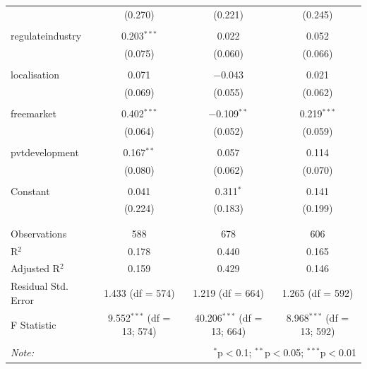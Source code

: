 \documentclass[
]{article}
\begin{document}
\begin{table}[!htbp]
\begin{tabular}{@{\extracolsep{5pt}}lccc}
  & (0.270) & (0.221) & (0.245) \\ 
  & & & \\ 
 regulateindustry & 0.203$^{***}$ & 0.022 & 0.052 \\ 
  & (0.075) & (0.060) & (0.066) \\ 
  & & & \\ 
 localisation & 0.071 & $-$0.043 & 0.021 \\ 
  & (0.069) & (0.055) & (0.062) \\ 
  & & & \\ 
 freemarket & 0.402$^{***}$ & $-$0.109$^{**}$ & 0.219$^{***}$ \\ 
  & (0.064) & (0.052) & (0.059) \\ 
  & & & \\ 
 pvtdevelopment & 0.167$^{**}$ & 0.057 & 0.114 \\ 
  & (0.080) & (0.062) & (0.070) \\ 
  & & & \\ 
 Constant & 0.041 & 0.311$^{*}$ & 0.141 \\ 
  & (0.224) & (0.183) & (0.199) \\ 
  & & & \\ 
\hline \\[-1.8ex] 
Observations & 588 & 678 & 606 \\ 
R$^{2}$ & 0.178 & 0.440 & 0.165 \\ 
Adjusted R$^{2}$ & 0.159 & 0.429 & 0.146 \\ 
Residual Std. Error & 1.433 (df = 574) & 1.219 (df = 664) & 1.265 (df = 592) \\ 
F Statistic & 9.552$^{***}$ (df = 13; 574) & 40.206$^{***}$ (df = 13; 664) & 8.968$^{***}$ (df = 13; 592) \\ 
\hline 
\hline \\[-1.8ex] 
\textit{Note:}  & \multicolumn{3}{r}{$^{*}$p$<$0.1; $^{**}$p$<$0.05; $^{***}$p$<$0.01} \\ 
\end{tabular} 
\end{table} 
\endgroup
\end{document}
